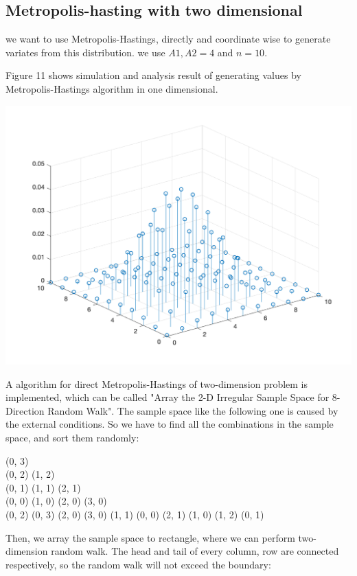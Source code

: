 \subsection{Metropolis-hasting with two dimensional}
we want to use Metropolis-Hastings, directly and coordinate wise to generate variates from this distribution. we use $A1,A2 = 4$
and $n = 10$.

Figure 11 shows simulation and analysis result of generating values by Metropolis-Hastings algorithm in one dimensional.

\begin{center}
    \includegraphics[scale=0.6]{Figures/figure6_2.png}\\
\end{center}

A algorithm for direct Metropolis-Hastings of two-dimension problem is implemented, which can be called "Array the 2-D Irregular Sample Space for 8-Direction Random Walk". The sample space like the following one is caused by the external conditions. So we have to find all the combinations in the sample space, and sort them randomly:

(0, 3) \\
(0, 2) (1, 2) \\
(0, 1) (1, 1) (2, 1) \\ 
(0, 0) (1, 0) (2, 0) (3, 0) \\

(0, 2) (0, 3) (2, 0) (3, 0) (1, 1) (0, 0) (2, 1) (1, 0) (1, 2) (0, 1)

Then, we array the sample space to rectangle, where we can perform two-dimension random walk. The head and tail of every column, row are connected respectively, so the random walk will not exceed the boundary:

